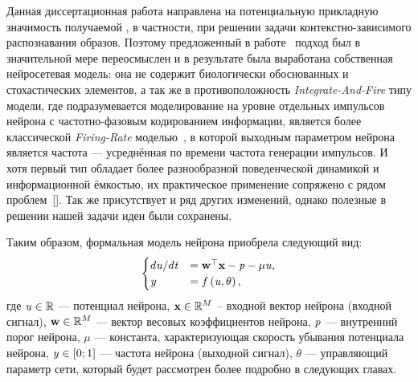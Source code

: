 Данная диссертационная работа направлена на потенциальную прикладную значимость получаемой , в частности, при решении задачи контекстно-зависимого распознавания образов. Поэтому предложенный в работе~\cite{EmelyanovYaroslavsky1990} подход был в значительной мере переосмыслен и в результате была выработана собственная нейросетевая модель: она не содержит биологически обоснованных и стохастических элементов, а так же в противоположность \textit{Integrate-And-Fire} типу модели, где подразумевается моделирование на уровне отдельных импульсов нейрона с частотно-фазовым кодированием информации, является более классической \textit{Firing-Rate}  моделью~\cite{Dayan2001}, в которой выходным параметром нейрона является \socalled частота --- усреднённая по времени частота генерации импульсов. И хотя первый тип обладает более разнообразной поведенческой динамикой и информационной ёмкостью, их практическое применение сопряжено с рядом проблем~[]. Так же присутствует и ряд других изменений, однако полезные в решении нашей задачи идеи были сохранены.

Таким образом, формальная модель нейрона приобрела следующий вид:
\begin{equation}
	\label{eq:single_neuron_model}
    \begin{cases}
	    d\mathit{u}/d\mathit{t} &= \mathrm{\mathbf{w}}^{\top} \mathrm{\mathbf{x}} - \mathit{p} - \mu \mathit{u}, \\
        \mathit{y}              &= f\left( \mathit{u}, \theta \right), \\
    \end{cases}
\end{equation}
где $\mathit{u} \in \mathbb{R}$ --- потенциал нейрона, $\mathrm{\mathbf{x}} \in \mathbb{R}^{M}$ -- входной вектор нейрона (входной сигнал), $\mathrm{\mathbf{w}} \in \mathbb{R}^{M}$ --- вектор весовых коэффициентов нейрона,  $\mathit{p}$ --- внутренний порог нейрона, $\mu$ --- константа, характеризующая скорость убывания потенциала нейрона, $\mathit{y} \in \left[0;1\right]$ --- частота нейрона (выходной сигнал), $\theta$ --- управляющий параметр сети, который будет рассмотрен более подробно в следующих главах.

